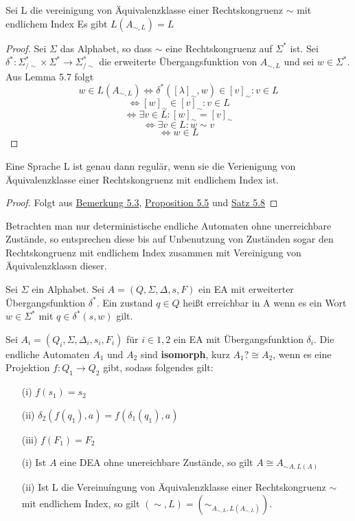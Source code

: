  Sei L die vereinigung von Äquivalenzklasse einer Rechtskongruenz $\sim$ mit endlichem Index Es gibt $L(A_{\sim, L}) = L$ 
\begin{proof}
  Sei $\Sigma$ das Alphabet, so dass $\sim$ eine Rechtskongruenz auf $\Sigma^{*}$ ist. Sei $\delta^{*} : \Sigma^{*}_{/\sim} \times \Sigma^{*} \rightarrow \Sigma^{*}_{/\sim}$ die erweiterte Übergangsfunktion von $A_{\sim, L}$ und sei $w \in \Sigma^{*}$. Aus Lemma 5.7 folgt 
  \[w \in L(A_{\sim, L}) \Leftrightarrow \delta^{*}([\lambda]_{\sim}, w) \in {[v]_{\sim} : v \in L}\]
  \[\Leftrightarrow [w]_{\sim} \in {[v]_{\sim} : v\in L}\]
  \[\Leftrightarrow \exists v \in L : [w]_{\sim} = [v]_{\sim}\]
  \[\Leftrightarrow \exists v \in L : w \sim v\]
  \[\Leftrightarrow w \in L\]
\end{proof}

 Eine Sprache L ist genau dann regulär, wenn sie die Verienigung von Äquivalenzklasse einer Rechtskongruenz mit endlichem Index ist. 
\begin{proof}
  Folgt aus \hyperref[subsec:5.3]{Bemerkung 5.3}, \hyperref[subsec:5.5]{Proposition 5.5} und \hyperref[subsec:5.8]{Satz 5.8}
\end{proof}
Betrachten man nur deterministische endliche Automaten ohne unerreichbare Zustände, so entsprechen diese bis auf Unbenutzung von Zuständen sogar den Rechtskongruenz mit endlichem Index zusammen mit Vereinigung von Äquivalenzklassn dieser.

 Sei $\Sigma$ ein Alphabet. Sei $A = (Q, \Sigma, \Delta, s, F)$ ein EA mit erweiterter Übergangsfunktion $\delta^{*}$. Ein zustand $q\in Q$ heißt erreichbar in A wenn es ein Wort $w \in \Sigma ^{*}$ mit $q\in \delta^{*}(s, w)$ gilt.

 Sei $A_{i} = (Q_{i}, \Sigma, \Delta_{i}, s_{i}, F_{i})$ für $i \in {1,2}$ ein EA mit Übergangsfunktion $\delta_{i}$. Die endliche Automaten $A_{1}$ und $A_{2}$ sind \textbf{isomorph}, kurz $A_{1}? \cong A_{2}$, wenn es eine Projektion $f:Q_{1}\rightarrow Q_{2}$ gibt, sodass folgendes gilt:
\begin{itemize}
    \item [(i)] $f(s_{1}) = s_{2}$
    \item [(ii)] $\delta_{2}(f(q_{1}), a) = f(\delta_{1}(q_{1}), a)$
    \item [(iii)] $f(F_1) = F_2$
\end{itemize}

\begin{itemize}
  \item [(i)] Ist $A$ eine DEA ohne unereichbare Zustände, so gilt $A \cong A_{\sim A, L(A)}$
  \item [(ii)] Ist L die Vereinuíngung von Äquivalenzklasse einer Rechtskongruenz $\sim$ mit endlichem Index, so gilt $(\sim, L) = (\sim_{A_{\sim, L}, L(A_{\sim, L})})$.
\end{itemize}

